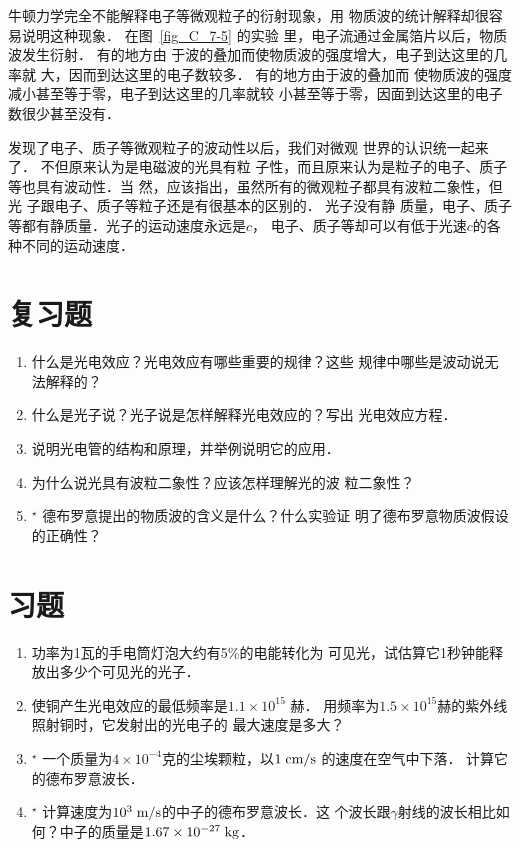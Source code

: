 牛顿力学完全不能解释电子等微观粒子的衍射现象，用
物质波的统计解释却很容易说明这种现象．
在图~\ref{fig_C_7-5} 的实验
里，电子流通过金属箔片以后，物质波发生衍射．
有的地方由
于波的叠加而使物质波的强度增大，电子到达这里的几率就
大，因而到达这里的电子数较多．
有的地方由于波的叠加而
使物质波的强度减小甚至等于零，电子到达这里的几率就较
小甚至等于零，因面到达这里的电子数很少甚至没有．

发现了电子、质子等微观粒子的波动性以后，我们对微观
世界的认识统一起来了．
不但原来认为是电磁波的光具有粒
子性，而且原来认为是粒子的电子、质子等也具有波动性．当
然，应该指出，虽然所有的微观粒子都具有波粒二象性，但光
子跟电子、质子等粒子还是有很基本的区别的．
光子没有静
质量，电子、质子等都有静质量．光子的运动速度永远是$c$，
电子、质子等却可以有低于光速$c$的各种不同的运动速度．

\section*{复习题}
\begin{enumerate}
\item 什么是光电效应？光电效应有哪些重要的规律？这些
规律中哪些是波动说无法解释的？
\item 什么是光子说？光子说是怎样解释光电效应的？写出
光电效应方程．
\item 说明光电管的结构和原理，并举例说明它的应用．
\item 为什么说光具有波粒二象性？应该怎样理解光的波
粒二象性？
\item$^\star$ 德布罗意提出的物质波的含义是什么？什么实验证
明了德布罗意物质波假设的正确性？
\end{enumerate}

\section*{习题}
\begin{enumerate}
    \item 功率为1瓦的手电筒灯泡大约有5\%的电能转化为
可见光，试估算它1秒钟能释放出多少个可见光的光子．
\item 使铜产生光电效应的最低频率是$1.1\times10^{15}$
赫．
用频率为$1.5\times10^{15}$赫的紫外线照射铜时，它发射出的光电子的
最大速度是多大？
\item$^\star$ 一个质量为$4\times10^{-4}$克的尘埃颗粒，以$1 \;\text{cm}/\text{s}$
的速度在空气中下落．
计算它的德布罗意波长．
\item$^\star$ 计算速度为$10^3\;\text{m}/\text{s}$的中子的德布罗意波长．这
个波长跟$\gamma$射线的波长相比如何？中子的质量是$1.67\times10^{-27} \;\text{kg} $．
\end{enumerate}




